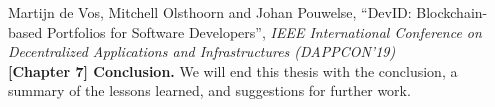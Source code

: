 Martijn de Vos, Mitchell Olsthoorn and Johan Pouwelse, \enquote{DevID: Blockchain-based Portfolios for Software Developers}, \emph{IEEE International Conference on Decentralized Applications and Infrastructures (DAPPCON'19)}\\

\textbf{[Chapter 7] Conclusion.} We will end this thesis with the conclusion, a summary of the lessons learned, and suggestions for further work.





%
%